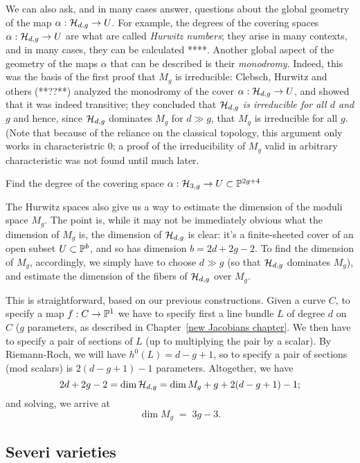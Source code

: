 We can also ask, and in many cases answer, questions about the global geometry of the map $\alpha : \cH_{d,g} \to U$. For example, the degrees of the covering spaces $\alpha : \cH_{d,g} \to U$ are what are called \emph{Hurwitz numbers}; they arise in many contexts, and in many cases, they can be calculated **\cite{}**. Another global aspect of the geometry of the maps $\alpha$ that can be described is their \emph{monodromy}. Indeed, this  was the basis of the first proof that $M_g$ is irreducible: Clebsch, Hurwitz and others (**??**) analyzed the monodromy of the cover $\alpha : \cH_{d,g} \to U$, and showed that it was indeed transitive; they concluded that \emph{$\cH_{d,g}$ is irreducible for all $d$ and $g$} and hence, since $\cH_{d,g}$ dominates $M_g$ for $d \gg g$, that $M_g$ is irreducible for all $g$. (Note that because of the reliance on the classical topology, this argument only works in characteristric 0; a proof of the irreducibility of $M_g$ valid in arbitrary characteristic was not found until much later. 

\begin{exercise}
Find the degree of the covering space $\alpha : \cH_{3,g} \to U \subset \PP^{2g+4}$
\end{exercise}

The Hurwitz spaces also give us a way to estimate the dimension of the moduli space $M_g$. The point is, while it may not be immediately obvious what the dimension of $M_g$ is, the dimension of $\cH_{d,g}$ is clear: it's a finite-sheeted cover of an open subset $U \subset \PP^b$, and so has dimension  $b = 2d+2g-2$. To find the dimension of $M_g$, accordingly, we simply have to choose $d \gg g$ (so that $\cH_{d,g}$ dominates $M_g$), and estimate the dimension of the fibers of $\cH_{d,g}$ over $M_g$.

This is straightforward, based on our previous constructions. Given a curve $C$, to specify a map $f : C \to \PP^1$ we have to specify first a line bundle $L$ of degree $d$ on $C$ ($g$ parameters, as described in Chapter~\ref{new Jacobians chapter}. We then have to specify a pair of sections of $L$ (up to multiplying the pair by a scalar). By Riemann-Roch, we will have $h^0(L) = d-g+1$, so to specify a pair of sections (mod scalars) is $2(d-g+1)-1$ parameters. Altogether, we have
$$
2d+2g-2 = \dim \cH_{d,g} = \dim M_g + g + 2(d-g+1)-1;
$$
and solving, we arrive at
$$
\dim M_g \; = \; 3g-3.
$$




\subsection{Severi varieties}

